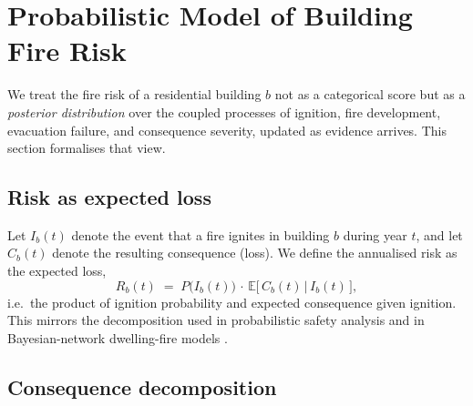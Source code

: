 \section{Probabilistic Model of Building Fire Risk}
\label{sec:model}

We treat the fire risk of a residential building $b$ not as a categorical score
but as a \emph{posterior distribution} over the coupled processes of ignition,
fire development, evacuation failure, and consequence severity, updated as
evidence arrives. This section formalises that view.

\subsection{Risk as expected loss}

Let $I_b(t)$ denote the event that a fire ignites in building $b$ during
year $t$, and let $C_b(t)$ denote the resulting consequence (loss). We define the
annualised risk as the expected loss,
\begin{equation}
  R_b(t) \;=\; P\!\big(I_b(t)\big)\,\cdot\,
  \mathbb{E}\!\big[\,C_b(t)\,\big|\,I_b(t)\,\big],
  \label{eq:risk}
\end{equation}
i.e.\ the product of ignition probability and expected consequence given
ignition. This mirrors the decomposition used in probabilistic safety analysis
and in Bayesian-network dwelling-fire models
\citep{matellini2018threepart,estradalugo2019grenfell}.

\subsection{Consequence decomposition}

